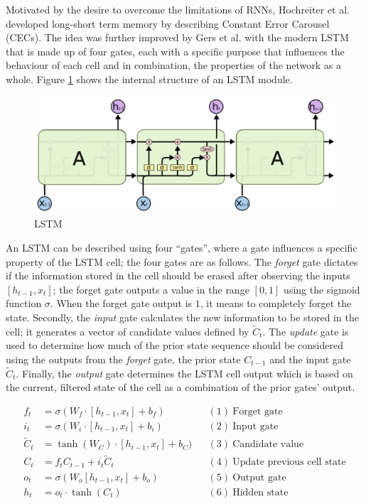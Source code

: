 Motivated by the desire to overcome the limitations of RNNs, Hochreiter et al. \cite{hochreiter1997long} developed long-short term memory by describing Constant Error Carousel (CECs). The idea was further improved by Gers et al. \cite{gers1999learning} with the modern LSTM that is made up of four gates, each with a specific purpose that influences the behaviour of each cell and in combination, the properties of the network as a whole. Figure \ref{fig:bg:lstm} shows the internal structure of an LSTM module.

\begin{figure}[ht]
  \centering
  \includegraphics[width=0.75\columnwidth]{sections/2background/images/lstm.png}
  \caption[Structure of an unrolled LSTM]{LSTM}
  \label{fig:bg:lstm}
\end{figure}

An LSTM can be described using four ``gates'', where a gate influences a specific property of the LSTM cell; the four gates are as follows. The \textit{forget} gate dictates if the information stored in the cell should be erased after observing the inputs $[h_{t-1}, x_t]$; the forget gate outputs a value in the range $[0, 1]$ using the sigmoid function $\sigma$. When the forget gate output is $1$, it means to completely forget the state. Secondly, the \textit{input} gate calculates the new information to be stored in the cell; it generates a vector of candidate values defined by $\tilde{C}_t$. The \textit{update} gate is used to determine how much of the prior state sequence should be considered using the outputs from the \textit{forget} gate, the prior state $C_{t-1}$ and the input gate $\tilde{C}_t$. Finally, the \textit{output} gate determines the LSTM cell output which is based on the current, filtered state of the cell as a combination of the prior gates' output.

\begin{center}
  \begin{align*}
    f_t &= \sigma (W_f \cdot [h_{t-1}, x_t] + b_f) && (1)~\text{Forget gate} \\
    i_t &= \sigma (W_i \cdot [h_{t-1}, x_t] + b_i) && (2)~\text{Input gate} \\
    \tilde{C}_t &= \tanh (W_C) \cdot [h_{t-1}, x_t] + b_C) && (3)~\text{Candidate value} \\
    C_t &= f_t C_{t-1} + i_t \tilde{C}_t && (4)~\text{Update previous cell state} \\
    o_t &= \sigma (W_o [h_{t-1}, x_t] + b_o) && (5)~\text{Output gate} \\
    h_t &= o_t \cdot \tanh (C_t) && (6)~\text{Hidden state}
  \end{align*}
\end{center}

